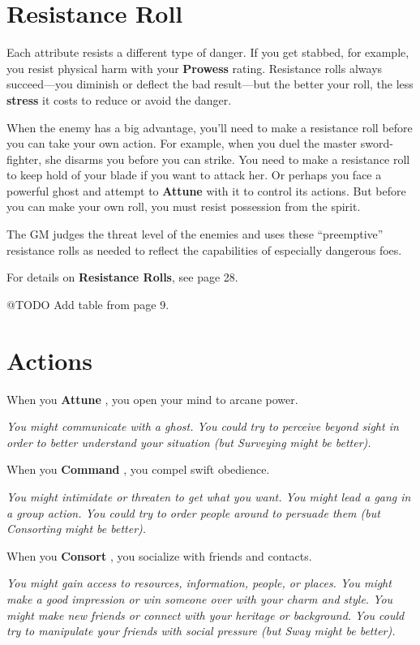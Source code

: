 \documentclass[11pt,fleqn,a5paper]{book}
\newcommand{\gameterm}[1]{\textbf{#1}}
\begin{document}
\section{Resistance Roll}

Each attribute resists a different type of danger. If you get stabbed, for example, you resist physical harm with your \gameterm{Prowess}  rating. Resistance rolls always succeed---you diminish or deflect the bad result---but the better your roll, the less \textbf{stress} it costs to reduce or avoid the danger.

When the enemy has a big advantage, you’ll need to make a resistance roll before you can take your own action. For example, when you duel the master sword-fighter, she disarms you before you can strike. You need to make a resistance roll to keep hold of your blade if you want to attack her. Or perhaps you face a powerful ghost and attempt to \gameterm{Attune}  with it to control its actions. But before you can make your own roll, you must resist possession from the spirit.

The GM judges the threat level of the enemies and uses these “preemptive” resistance rolls as needed to reflect the capabilities of especially dangerous foes.

For details on \textbf{Resistance Rolls}, see page 28.

@TODO Add table from page 9.

\section{Actions}

When you \gameterm{Attune} , you open your mind to arcane power.

\emph{You might communicate with a ghost. You could try to perceive beyond sight in order to better understand your situation (but Surveying might be better).}

When you \gameterm{Command} , you compel swift obedience.

\emph{You might intimidate or threaten to get what you want. You might lead a gang in a group action. You could try to order people around to persuade them (but Consorting might be better).}

When you \gameterm{Consort} , you socialize with friends and contacts.

\emph{You might gain access to resources, information, people, or places. You might make a good impression or win someone over with your charm and style. You might make new friends or connect with your heritage or background. You could try to manipulate your friends with social pressure (but Sway might be better).}
\end{document}
